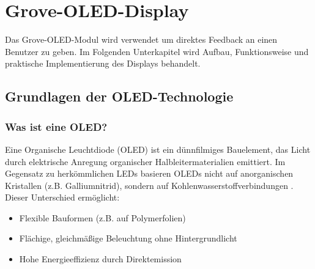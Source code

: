 %
%

\chapter{Grove-OLED-Display} \label{sec:Grove-OLED-Display}

Das Grove-OLED-Modul wird verwendet um direktes Feedback an einen Benutzer zu geben. Im Folgenden Unterkapitel wird Aufbau, Funktionsweise und praktische Implementierung des Displays behandelt.

\section{Grundlagen der OLED-Technologie}

\subsection{Was ist eine OLED?}
Eine Organische Leuchtdiode (OLED) ist ein dünnfilmiges Bauelement, das Licht durch elektrische Anregung organischer Halbleitermaterialien emittiert. Im Gegensatz zu herkömmlichen LEDs basieren OLEDs nicht auf anorganischen Kristallen (z.B. Galliumnitrid), sondern auf Kohlenwasserstoffverbindungen \cite{Bartlett:2023} . Dieser Unterschied ermöglicht: 

\begin{itemize}
	\item Flexible Bauformen (z.B. auf Polymerfolien)
	\item Flächige, gleichmäßige Beleuchtung ohne Hintergrundlicht
	\item Hohe Energieeffizienz durch Direktemission
\end{itemize}
\cite{Bartlett:2023} \cite{Stotz:2019} \cite{Wellmann:2017} 


